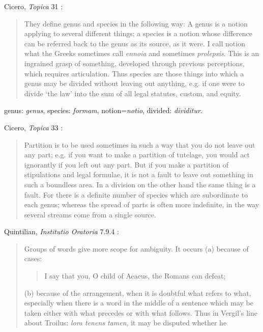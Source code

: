 \documentclass{article}
\begin{document}
Cicero, {\em Topica} 31 \cite[p.~131]{reinhardt}:

\begin{quote}
They define genus and species in the following way: A genus
is a notion applying to several different things; a species is a notion
whose difference can be referred back to the genus as its source,
as it were. I call notion what the Greeks sometimes call {\em ennoia}
and sometimes {\em prolepsis}. This is an ingrained grasp of something,
developed through previous perceptions, which requires articulation.
Thus species are those things into which a genus may
be divided without leaving out anything, e.g. if one were to
divide `the law' into the sum of all legal statutes, custom,
and equity. 
\end{quote}

genus: {\em genus}, species: {\em formam}, notion={\em notio}, divided: {\em dividitur}.

Cicero, {\em Topica} 33 \cite[p.~133]{reinhardt}:

\begin{quote}
Partition is to be used sometimes in such a way that you do
not leave out any part; e.g. if you want to make a partition of
tutelage, you would act ignorantly if you left out any part. But if
you make a partition of stipulations and legal formulae, it is not a
fault to leave out something in such a boundless area. In a division
on the other hand the same thing is a fault. For there is a definite
number of species which are subordinate to each genus; whereas
the spread of parts is often more indefinite, in the way several
streams come from a single source.
\end{quote}

Quintilian, {\em Institutio Oratoria} 7.9.4 \cite[p.~283]{LCL126}:

\begin{quote}
Groups of words give more scope for ambiguity. It occurs 
(a) because of cases:

\begin{quote}
I say that you, O child of Aeacus, the Romans can defeat;
\end{quote}

(b) because of the arrangement, when it is doubtful what refers to
what, especially when there is a word in the middle of a sentence
which may be taken either with what precedes or with what
follows. Thus in Vergil's line about Troilus: {\em lora tenens tamen}, it
may be disputed whether he
\end{quote}
\end{document}
